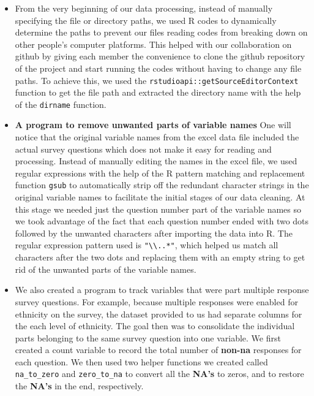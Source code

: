 \documentclass[
  10pt,
]{article}
\begin{document}
\begin{itemize}
\item
  From the very beginning of our data processing, instead of manually specifying the file or directory paths, we used R codes to dynamically determine the paths to prevent our files reading codes from breaking down on other people's computer platforms. This helped with our collaboration on github by giving each member the convenience to clone the github repository of the project and start running the codes without having to change any file paths. To achieve this, we used the \texttt{rstudioapi::getSourceEditorContext} function to get the file path and extracted the directory name with the help of the \texttt{dirname} function.
\item
  \textbf{A program to remove unwanted parts of variable names}
  One will notice that the original variable names from the excel data file included the actual survey questions which does not make it easy for reading and processing. Instead of manually editing the names in the excel file, we used regular expressions with the help of the R pattern matching and replacement function \texttt{gsub} to automatically strip off the redundant character strings in the original variable names to facilitate the initial stages of our data cleaning. At this stage we needed just the question number part of the variable names so we took advantage of the fact that each question number ended with two dots followed by the unwanted characters after importing the data into R. The regular expression pattern used is \texttt{"\textbackslash{}\textbackslash{}..*"}, which helped us match all characters after the two dots and replacing them with an empty string to get rid of the unwanted parts of the variable names.
\item
  We also created a program to track variables that were part multiple response survey questions. For example, because multiple responses were enabled for ethnicity on the survey, the dataset provided to us had separate columns for the each level of ethnicity. The goal then was to consolidate the individual parts belonging to the same survey question into one variable. We first created a count variable to record the total number of \textbf{non-na} responses for each question. We then used two helper functions we created called \texttt{na\_to\_zero} and \texttt{zero\_to\_na} to convert all the \textbf{NA's} to zeros, and to restore the \textbf{NA's} in the end, respectively.
\end{itemize}
\end{document}
